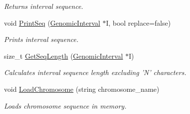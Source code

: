 \begin{CompactItemize}
\begin{CompactList}\small\item\em Returns interval sequence. \item\end{CompactList}\item 
\hypertarget{classChromosomes_c732efe7b6dcc645861507257bf66347}{
void \hyperlink{classChromosomes_c732efe7b6dcc645861507257bf66347}{PrintSeq} (\hyperlink{classGenomicInterval}{GenomicInterval} $\ast$I, bool replace=false)}
\label{classChromosomes_c732efe7b6dcc645861507257bf66347}

\begin{CompactList}\small\item\em Prints interval sequence. \item\end{CompactList}\item 
\hypertarget{classChromosomes_044da4339ffcc9a892ea35198bbb9f36}{
size\_\-t \hyperlink{classChromosomes_044da4339ffcc9a892ea35198bbb9f36}{GetSeqLength} (\hyperlink{classGenomicInterval}{GenomicInterval} $\ast$I)}
\label{classChromosomes_044da4339ffcc9a892ea35198bbb9f36}

\begin{CompactList}\small\item\em Calculates interval sequence length excluding 'N' characters. \item\end{CompactList}\item 
\hypertarget{classChromosomes_7f4e8938bd27e1fdb81f7ab33a44d62a}{
void \hyperlink{classChromosomes_7f4e8938bd27e1fdb81f7ab33a44d62a}{LoadChromosome} (string chromosome\_\-name)}
\label{classChromosomes_7f4e8938bd27e1fdb81f7ab33a44d62a}

\begin{CompactList}\small\item\em Loads chromosome sequence in memory. \item\end{CompactList}\end{CompactItemize}
